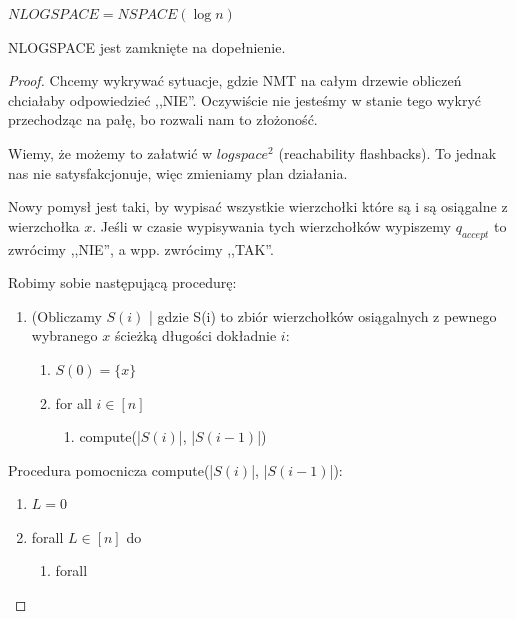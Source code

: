 \begin{definition}
	\( NLOGSPACE = NSPACE(\log n) \)
\end{definition}

\begin{lemma}
	NLOGSPACE jest zamknięte na dopełnienie.
\end{lemma}
\begin{proof}
	Chcemy wykrywać sytuacje, gdzie NMT na całym drzewie obliczeń chciałaby odpowiedzieć ,,NIE''. Oczywiście nie jesteśmy w stanie tego wykryć przechodząc na pałę, bo rozwali nam to złożoność.

	Wiemy, że możemy to załatwić w \(logspace^2\) (reachability flashbacks). To jednak nas nie satysfakcjonuje, więc zmieniamy plan działania.

	Nowy pomysł jest taki, by wypisać wszystkie wierzchołki które są i są osiągalne z wierzchołka $x$. Jeśli w czasie wypisywania tych wierzchołków wypiszemy $q_{accept}$ to zwrócimy ,,NIE'', a wpp. zwrócimy ,,TAK''.

	Robimy sobie następującą procedurę:

	\begin{enumerate}
		\item (Obliczamy \( S(i) \) | gdzie S(i) to zbiór wierzchołków osiągalnych z pewnego wybranego \(x\) ścieżką długości dokładnie \( i \):
		      \begin{enumerate}
			      \item \( S(0) = \{ x \} \)
			      \item for all \( i \in [n] \)
			            \begin{enumerate}
				            \item compute(|\(S(i)\)|, |\(S(i-1)\)|)
			            \end{enumerate}
		      \end{enumerate}
	\end{enumerate}

	Procedura pomocnicza compute(|\(S(i)\)|, |\(S(i-1)\)|):

	\begin{enumerate}
		\item \( L = 0 \)
		\item forall \( L \in [n] \) do
		      \begin{enumerate}
			      \item forall
		      \end{enumerate}
	\end{enumerate}
\end{proof}

